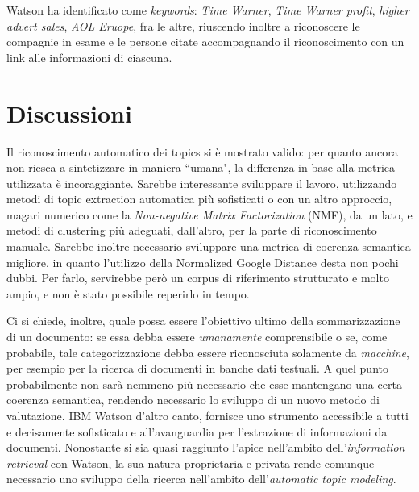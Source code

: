 \documentclass[]{article}
\begin{document}
Watson ha identificato come \textit{keywords}: \textit{Time Warner}, \textit{Time Warner profit}, \textit{higher advert sales}, \textit{AOL Eruope}, fra le altre, riuscendo inoltre a riconoscere le compagnie in esame e le persone citate accompagnando il riconoscimento con un link alle informazioni di ciascuna.
\section{Discussioni}
Il riconoscimento automatico dei topics si è mostrato valido: per quanto ancora non riesca a sintetizzare in maniera ``umana", la differenza in base alla metrica utilizzata è incoraggiante. Sarebbe interessante sviluppare il lavoro, utilizzando metodi di topic extraction automatica più sofisticati o con un altro approccio, magari numerico come la \textit{Non-negative Matrix Factorization }(NMF), da un lato, e metodi di clustering più adeguati, dall'altro, per la parte di riconoscimento manuale.
\newline
Sarebbe inoltre necessario sviluppare una metrica di coerenza semantica migliore, in quanto l'utilizzo della Normalized Google Distance desta non pochi dubbi. Per farlo, servirebbe però un corpus di riferimento strutturato e molto ampio, e non è stato possibile reperirlo in tempo.


Ci si chiede, inoltre, quale possa essere l'obiettivo ultimo della sommarizzazione di un documento: se essa debba essere \textit{umanamente} comprensibile o se, come probabile, tale categorizzazione debba essere riconosciuta solamente da \textit{macchine}, per esempio per la ricerca di documenti in banche dati testuali. A quel punto probabilmente non sarà nemmeno più necessario che esse mantengano una certa coerenza semantica, rendendo necessario lo sviluppo di un nuovo metodo di valutazione.
\newline
IBM Watson d'altro canto, fornisce uno strumento accessibile a tutti e decisamente sofisticato e all'avanguardia per l'estrazione di informazioni da documenti. Nonostante si sia quasi raggiunto l'apice nell'ambito dell'\textit{information retrieval} con Watson, la sua natura proprietaria e privata rende comunque necessario uno sviluppo della ricerca nell'ambito dell'\textit{automatic topic modeling}.

\nocite{*}
\printbibliography
\end{document}

